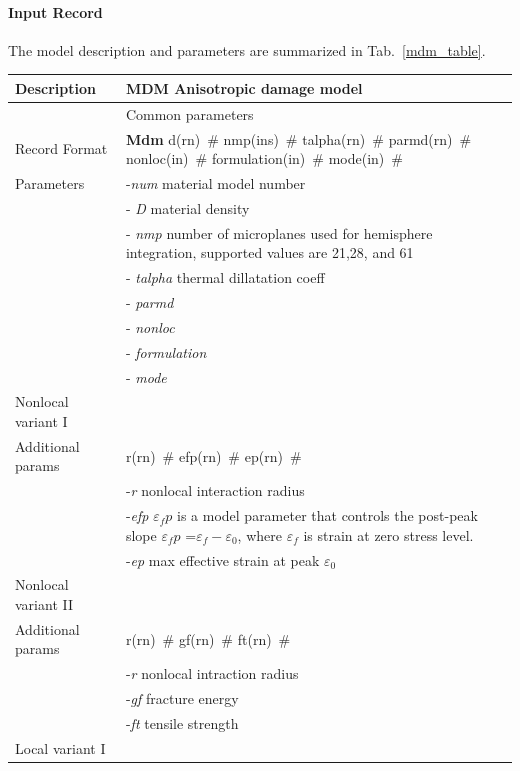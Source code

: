 \documentclass[a4paper]{article}
\newcommand{\descitem}[1]{{\noindent \bf #1}}
\newcommand{\elemparam}[2]{{{#1\tiny (#2)}~\#}}
\newcommand{\param}[1]{{\it #1}}
\begin{document}
\paragraph{Input Record}
The model description and parameters are summarized
in Tab.~\ref{mdm_table}.

\begin{table}[!htb]
\begin{tabular}{|l|p{9cm}|}
\hline
Description & MDM Anisotropic damage model\\
\hline
& Common parameters\\
Record Format & \descitem{Mdm} \elemparam{d}{rn} \elemparam{nmp}{ins} \elemparam{talpha}{rn}
\elemparam{parmd}{rn}  \elemparam{nonloc}{in}
\elemparam{formulation}{in} \elemparam{mode}{in}\\
Parameters & -\param{num} material model number\\
& - \param{D} material density\\
& - \param{nmp} number of microplanes used for hemisphere integration,
supported values are 21,28, and 61\\
& - \param{talpha}  thermal dillatation coeff\\
& - \param{parmd} \\
& - \param{nonloc} \\
& - \param{formulation}\\
& - \param{mode}\\
\hline
Nonlocal variant I&\\
Additional params &\elemparam{r}{rn} \elemparam{efp}{rn}
\elemparam{ep}{rn} \\
& -\param{r} nonlocal interaction radius\\
& -\param{efp} $\varepsilon_fp$ is a model parameter that controls
the post-peak slope $\varepsilon_fp$ =$\varepsilon_f-\varepsilon_0$,
where $\varepsilon_f$ is strain at zero stress level.\\
& -\param{ep} max effective strain at peak $\varepsilon_0$\\
\hline
Nonlocal variant II&\\
Additional params &\elemparam{r}{rn} \elemparam{gf}{rn}
\elemparam{ft}{rn}\\
& -\param{r} nonlocal intraction radius\\
& -\param{gf} fracture energy\\
& -\param{ft} tensile strength\\
\hline
Local variant I&\\

\end{tabular}
\end{table}
\end{document}
